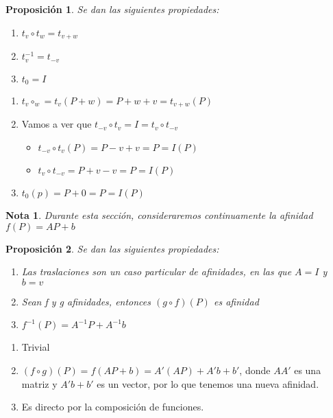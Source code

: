 \documentclass[11pt, a4paper, titlepage]{article}
\makeatletter
\renewenvironment{proof}[1][\proofname] {\vspace{-15pt}\par\pushQED{\qed}\normalfont\topsep6\p@\@plus6\p@\relax\trivlist\item[\hskip\labelsep\it#1\@addpunct{.}]\ignorespaces}{\popQED\endtrivlist\@endpefalse}
\renewenvironment{proof}[1][\proofname] {\par\pushQED{\qed}\normalfont\topsep6\p@\@plus6\p@\relax\trivlist\item[\hskip\labelsep\itshape\sffamily#1\@addpunct{.}]\ignorespaces}{\popQED\endtrivlist\@endpefalse}
\theoremstyle{theorem-style}
\newtheorem{nprop}{Proposición}[section]
\theoremstyle{definition-style}
\theoremstyle{remark-style}
\newtheorem*{nota}{Nota}
\theoremstyle{example-style}
\newenvironment{nlist}
{\begin{enumerate}
    \renewcommand\labelenumi{(\emph{\roman{enumi})}}}
  {\end{enumerate}}
\makeatother
\begin{document}
\begin{nprop}
  Se dan las siguientes propiedades:
  \begin{nlist}
  \item $t_v \circ t_w = t_{v+w}$
  \item $t_{v}^{-1} = t_{-v}$
  \item $t_0 = I$
  \end{nlist}
\end{nprop}
\begin{proof}\hfill \begin{center}\end{center}
  \begin{nlist}
  \item $t_v \circ_w = t_v(P+w) = P+w+v = t_{v+w}(P)$
  \item Vamos a ver que $t_{-v}\circ t_v = I = t_v \circ t_{-v}$
    \begin{itemize}
    \item $t_{-v}\circ t_v (P) = P-v+v = P = I(P)$
    \item $t_v\circ t_{-v} = P+v-v = P = I(P)$
    \end{itemize}
  \item $t_0(p) = P +0 = P = I(P)$
  \end{nlist}
\end{proof}


\begin{nota}
  Durante esta sección, consideraremos continuamente la afinidad $f(P) = AP + b $
\end{nota}


\begin{nprop}
  Se dan las siguientes propiedades:
  \begin{nlist}
  \item Las traslaciones son un caso particular de afinidades, en las que $A = I$ y $b = v$
  \item Sean f y g afinidades, entonces $(g \circ f) (P)$ es afinidad
  \item $f^{-1}(P) = A^{-1}P +A^{-1}b$
    
  \end{nlist}
\end{nprop}
\begin{proof}
  \begin{nlist}
  \item Trivial
  \item $(f\circ g)(P) = f(AP +b) = A'(AP)+A'b +b' $, donde $AA'$ es una matriz y $A'b+b'$ es un vector, por lo que tenemos una nueva afinidad.
  \item Es directo por la composición de funciones.
  \end{nlist}
\end{proof}
\end{document}
